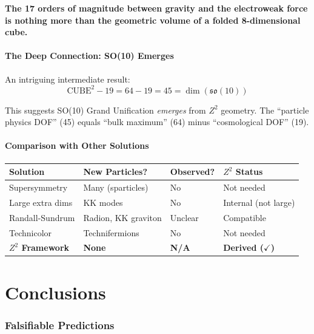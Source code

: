 \documentclass[11pt,a4paper]{article}
\theoremstyle{plain}
\theoremstyle{definition}
\theoremstyle{remark}
\newcommand{\CUBE}{\text{CUBE}}
\begin{document}
\textbf{The 17 orders of magnitude between gravity and the electroweak force is nothing more than the geometric volume of a folded 8-dimensional cube.}

\subsection{The Deep Connection: SO(10) Emerges}

An intriguing intermediate result:
\[
\CUBE^2 - 19 = 64 - 19 = 45 = \dim(\mathfrak{so}(10))
\]

This suggests SO(10) Grand Unification \emph{emerges} from $Z^2$ geometry. The ``particle physics DOF'' (45) equals ``bulk maximum'' (64) minus ``cosmological DOF'' (19).

\subsection{Comparison with Other Solutions}

\begin{center}
\begin{tabular}{llll}
\toprule
\textbf{Solution} & \textbf{New Particles?} & \textbf{Observed?} & \textbf{$Z^2$ Status} \\
\midrule
Supersymmetry & Many (sparticles) & No & Not needed \\
Large extra dims & KK modes & No & Internal (not large) \\
Randall-Sundrum & Radion, KK graviton & Unclear & Compatible \\
Technicolor & Technifermions & No & Not needed \\
\textbf{$Z^2$ Framework} & \textbf{None} & \textbf{N/A} & \textbf{Derived ($\checkmark$)} \\
\bottomrule
\end{tabular}
\end{center}

\part{Conclusions}

\section{Falsifiable Predictions}
\end{document}
